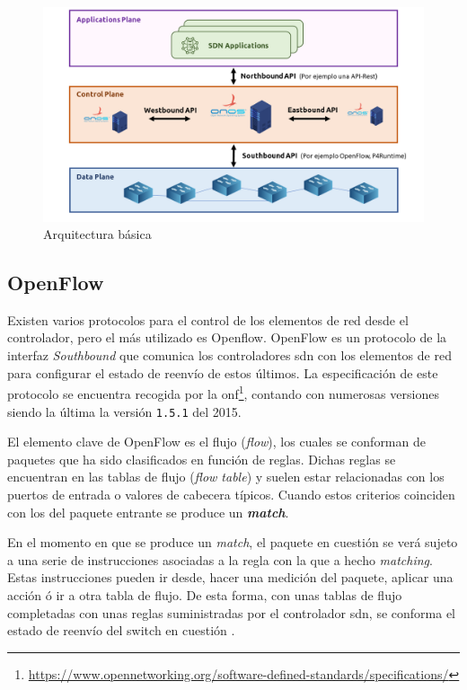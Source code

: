 \begin{figure}[ht]
    \centering
    \includegraphics[width=14.5cm]{archivos/img/teoria/sdn_arch.png}
    \caption{Arquitectura básica }
    \label{fig:sdnBasicArch}
\end{figure}

\subsection{OpenFlow}

Existen varios protocolos para el control de los elementos de red desde el controlador, pero el más utilizado es Openflow. OpenFlow es un protocolo de la interfaz \textit{Southbound} que comunica los controladores \gls{sdn} con los elementos de red para configurar el estado de reenvío de estos últimos. La especificación de este protocolo se encuentra recogida por la \gls{onf}\footnote{\url{https://www.opennetworking.org/software-defined-standards/specifications/}}, contando con numerosas versiones siendo la última la versión \texttt{1.5.1} del 2015. \\
\par

El elemento clave de OpenFlow es el flujo (\textit{flow}), los cuales se conforman de paquetes que ha sido clasificados en función de reglas. Dichas reglas se encuentran en las tablas de flujo (\textit{flow table}) y  suelen estar relacionadas con los puertos de entrada o valores de cabecera típicos. Cuando estos criterios coinciden con los del paquete entrante se produce un \textbf{\textit{match}}.\\
\par
En el momento en que se produce un \textit{match}, el paquete en cuestión se verá sujeto a una serie de instrucciones asociadas a la regla con la que a hecho \textit{matching}. Estas instrucciones pueden ir desde, hacer una medición del paquete, aplicar una acción ó ir a otra tabla de flujo. De esta forma, con unas tablas de flujo completadas con unas reglas suministradas por el controlador \gls{sdn}, se conforma el estado de reenvío del switch en cuestión \cite{nadeau2013sdn}. 
